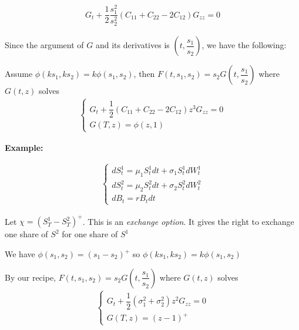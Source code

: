 \begin{equation*}
  \begin{gathered}
    G_t+\dfrac{1}{2}\dfrac{s_1^2}{s_2^2}\left(C_{11}+C_{22}-2C_{12}\right)G_{zz} = 0
  \end{gathered}
\end{equation*}
\par\bigskip
\noindent Since the argument of $G$ and its derivatives is $\left(t,\dfrac{s_1}{s_2}\right)$, we have the following:
\par\bigskip
\begin{lem}[]{}
  Assume $\phi(ks_1,ks_2) = k\phi(s_1,s_2)$, then $F(t,s_1,s_2) = s_2G\left(t,\dfrac{s_1}{s_2}\right)$ where $G(t,z)$ solves
  \begin{equation*}
    \begin{gathered}
      \begin{cases}
        G_t+\dfrac{1}{2}\left(C_{11}+C_{22}-2C_{12}\right)z^3G_{zz}=0\\
        G(T,z) = \phi(z,1)
      \end{cases}
    \end{gathered}
  \end{equation*}
\end{lem}
\par\bigskip
\noindent\textbf{Example:}\par
\begin{equation*}
  \begin{gathered}
    \begin{cases}
      dS_t^1 = \mu_1S_t^1dt+\sigma_1S_t^1dW_t^1\\
      dS_t^2=\mu_2S_t^2dt+\sigma_2S_t^2dW_t^2\\
      dB_t = rB_tdt
    \end{cases}
  \end{gathered}
\end{equation*}\par
\noindent Let $\chi = \left(S_T^1-S_T^2\right)^+$. This is an \textit{exchange option}. It gives the right to exchange one share of $S^2$ for one share of $S^1$\par
\noindent We have $\phi(s_1,s_2) = (s_1-s_2)^+$ so $\phi(ks_1,ks_2) = k\phi(s_1,s_2)$\par
\noindent By our recipe, $F(t,s_1,s_2) = s_2G\left(t,\dfrac{s_1}{s_2}\right)$ where $G(t,z)$ solves
\begin{equation*}
  \begin{gathered}
    \begin{cases}
      G_t+\dfrac{1}{2}\left(\sigma_1^2+\sigma_2^2\right)z^2G_{zz}=0\\
      G(T,z) = (z-1)^+
    \end{cases}
  \end{gathered}
\end{equation*}\par
